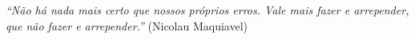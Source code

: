
\begin{epigrafe}

\textit{``Não há nada mais certo que nossos próprios erros. Vale mais fazer e arrepender, que não fazer e arrepender.''}
(Nicolau Maquiavel)

\end{epigrafe}

